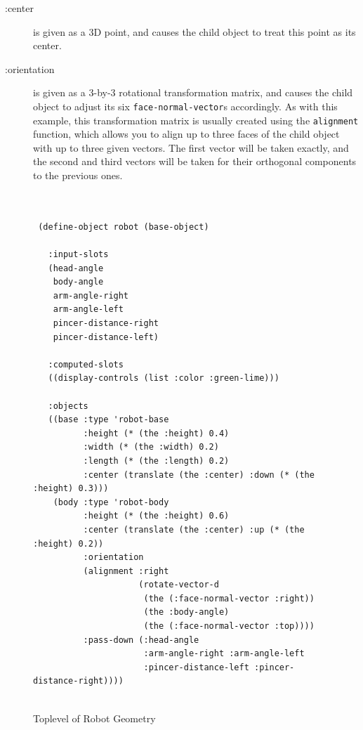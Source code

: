 \documentclass [11pt]{book}
\begin{document}
\begin{description}

\item [:center]
is given as a 3D point, and causes the child object to treat this
point as its center.

\item [:orientation]
is given as a 3-by-3 rotational transformation matrix, and causes 
the child object to adjust its six \texttt{face-normal-vector}s accordingly. As with this example, this transformation matrix is 
usually created using the \texttt{alignment} function, which allows you to align up to three faces of the child
object with up to three given vectors. The first vector will be taken exactly, 
and the second and third vectors will be taken for their orthogonal components 
to the previous ones.

\end{description}


\begin{figure}
\begin{lrbox}{\boxedverb}
\begin{minipage}{\linewidth}
\small{

\begin{verbatim}


 (define-object robot (base-object)

   :input-slots
   (head-angle
    body-angle
    arm-angle-right
    arm-angle-left
    pincer-distance-right
    pincer-distance-left)

   :computed-slots
   ((display-controls (list :color :green-lime)))

   :objects
   ((base :type 'robot-base
          :height (* (the :height) 0.4)
          :width (* (the :width) 0.2)
          :length (* (the :length) 0.2)
          :center (translate (the :center) :down (* (the :height) 0.3)))
    (body :type 'robot-body
          :height (* (the :height) 0.6)
          :center (translate (the :center) :up (* (the :height) 0.2))
          :orientation 
          (alignment :right
                     (rotate-vector-d 
                      (the (:face-normal-vector :right))
                      (the :body-angle)
                      (the (:face-normal-vector :top))))
          :pass-down (:head-angle 
                      :arm-angle-right :arm-angle-left 
                      :pincer-distance-left :pincer-distance-right))))      
      
\end{verbatim}}
\end{minipage}
\end{lrbox}
\fbox{\usebox{\boxedverb}}

\caption{Toplevel of Robot Geometry}

\label{code:robot-geometry-toplevel}

\end{figure}
\end{document}

